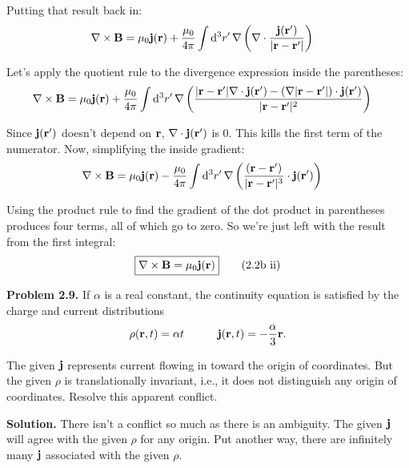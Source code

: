 \documentclass{article}
\begin{document}
Putting that result back in:
\[
\begin{aligned}
	\nabla\times\vb{B} &= \mu _0 \vb{j}(\vb{r}) + \frac{\mu _0}{4\pi}\int\dd[3]{r'}\nabla\left(\nabla\cdot \frac{\vb{j}(\vb{r'})}{|\vb{r}-\vb{r'}|}\right)
\end{aligned}
\]


Let's apply the quotient rule to the divergence expression inside the parentheses:
\[
\begin{aligned}
	\nabla\times\vb{B} &= \mu _0 \vb{j}(\vb{r}) + \frac{\mu _0}{4\pi}\int\dd[3]{r'}\nabla\left(\frac{|\vb{r}-\vb{r'}|\nabla\cdot\vb{j}(\vb{r'}) - (\nabla|\vb{r}-\vb{r'}|)\cdot\vb{j}(\vb{r'})}{|\vb{r}-\vb{r'}|^2}\right)
\end{aligned}
\]


Since $\vb{j}(\vb{r'})$ doesn't depend on $\vb{r}$, $\nabla\cdot\vb{j}(\vb{r'})$ is 0. This kills the first term of the numerator. Now, simplifying the inside gradient:
\[
\begin{aligned}
	\nabla\times\vb{B} &= \mu _0 \vb{j}(\vb{r}) - \frac{\mu _0}{4\pi}\int\dd[3]{r'}\nabla\left(\frac{(\vb{r}-\vb{r'})}{|\vb{r}-\vb{r'}|^3}\cdot\vb{j}(\vb{r'})\right)
\end{aligned}
\]


Using the product rule to find the gradient of the dot product in parentheses produces four terms, all of which go to zero. So we're just left with the result from the first integral:
\begin{equation}
	\boxed{\nabla\times\vb{B} = \mu_0\vb{j}(\vb{r})}\tag{2.2b ii}\label{eq:2.2b2}
\end{equation}
	

\hrulefill

\textbf{Problem 2.9.} If $\alpha$ is a real constant, the continuity equation is satisfied by the charge and current distributions
\[
\begin{aligned}
	\rho (\vb{r},t) = \alpha t \quad\quad\quad \vb{j}(\vb{r},t) = -\frac{\alpha}{3}\vb{r}.
\end{aligned}
\]

The given $\vb{j}$ represents current flowing in toward the origin of coordinates. But the given $\rho$ is translationally invariant, i.e., it does not distinguish any origin of coordinates. Resolve this apparent conflict.

\textbf{Solution.} There isn't a conflict so much as there is an ambiguity. The given $\vb{j}$ will agree with the given $\rho$ for any origin. Put another way, there are infinitely many $\vb{j}$ associated with the given $\rho$.
\end{document}
